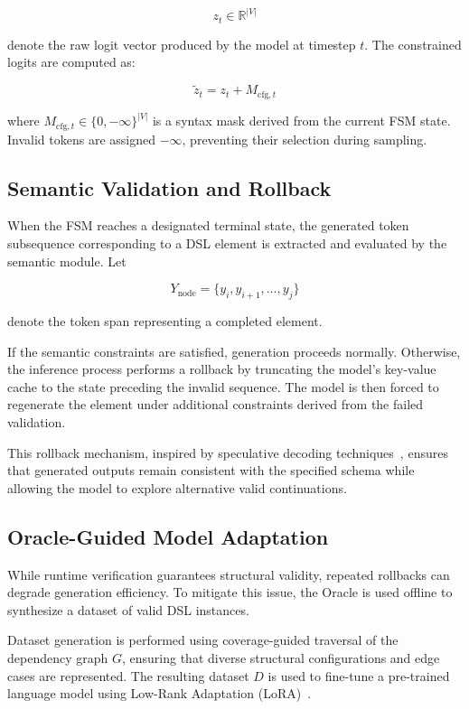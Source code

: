 \begin{equation}
z_t \in \mathbb{R}^{|V|}
\end{equation}

denote the raw logit vector produced by the model at timestep $t$. The 
constrained logits are computed as:

\begin{equation}
\tilde{z}_t = z_t + M_{\text{cfg},t}
\end{equation}

where $M_{\text{cfg},t} \in \{0, -\infty\}^{|V|}$ is a syntax mask 
derived from the current FSM state. Invalid tokens are assigned $-\infty$, 
preventing their selection during sampling.

\subsection{Semantic Validation and Rollback}
When the FSM reaches a designated terminal state, the generated token 
subsequence corresponding to a DSL element is extracted and evaluated 
by the semantic module. Let

\begin{equation}
Y_{\text{node}} = \{y_i, y_{i+1}, \dots, y_j\}
\end{equation}

denote the token span representing a completed element.

If the semantic constraints are satisfied, generation proceeds normally. 
Otherwise, the inference process performs a rollback by truncating the model's 
key-value cache to the state preceding the invalid sequence. The model is then 
forced to regenerate the element under additional constraints derived from the 
failed validation.

This rollback mechanism, inspired by speculative decoding techniques~\cite{leviathan2023fast}, 
ensures that generated outputs remain consistent with the specified schema while allowing 
the model to explore alternative valid continuations.

\subsection{Oracle-Guided Model Adaptation}
While runtime verification guarantees structural validity, repeated rollbacks 
can degrade generation efficiency. To mitigate this issue, the Oracle is used 
offline to synthesize a dataset of valid DSL instances.

Dataset generation is performed using coverage-guided traversal of the 
dependency graph $G$, ensuring that diverse structural configurations and 
edge cases are represented. The resulting dataset $D$ is used to fine-tune 
a pre-trained language model using Low-Rank Adaptation (LoRA)~\cite{hu2021lora}.

